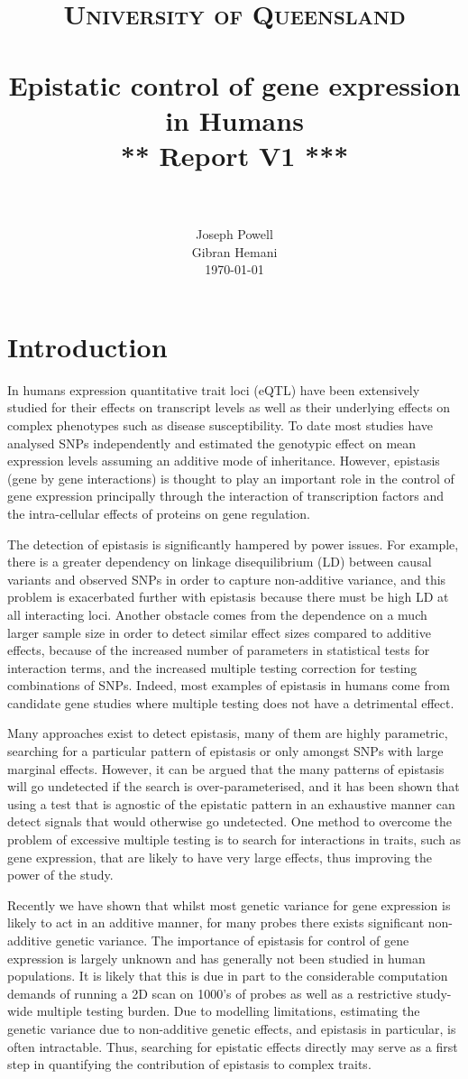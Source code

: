 \documentclass[paper=a4, fontsize=11pt]{scrartcl}	%
\title{
		\usefont{OT1}{bch}{b}{n}
		\normalfont \normalsize \textsc{University of Queensland} \\ [25pt]
		\horrule{0.5pt} \\[0.4cm]
		\huge Epistatic control of gene expression in Humans\\[0.3cm]
        \huge *** Report V1 *** \\
		\horrule{2pt} \\[0.5cm]
}
\author{
		\normalfont 								\normalsize
        Joseph Powell\\[-3pt]		\normalsize
        Gibran Hemani\\[0.2cm]		\normalsize
		\today
}
\date{}
\numberwithin{equation}{section}									%
\numberwithin{figure}{section}										%
\numberwithin{table}{section}										%
\begin{document}
\maketitle
\section{Introduction}
In humans expression quantitative trait loci (eQTL) have been extensively studied for their effects on transcript levels as well as their underlying effects on complex phenotypes such as disease susceptibility. To date most studies have analysed SNPs independently and estimated the genotypic effect on mean expression levels assuming an additive mode of inheritance. However, epistasis (gene by gene interactions) is thought to play an important role in the control of gene expression principally through the interaction of transcription factors and the intra-cellular effects of proteins on gene regulation.

The detection of epistasis is significantly hampered by power issues. For example, there is a greater dependency on linkage disequilibrium (LD) between causal variants and observed SNPs in order to capture non-additive variance, and this problem is exacerbated further with epistasis because there must be high LD at all interacting loci. Another obstacle comes from the dependence on a much larger sample size in order to detect similar effect sizes compared to additive effects, because of the increased number of parameters in statistical tests for interaction terms, and the increased multiple testing correction for testing combinations of SNPs. Indeed, most examples of epistasis in humans come from candidate gene studies where multiple testing does not have a detrimental effect. 

Many approaches exist to detect epistasis, many of them are highly parametric, searching for a particular pattern of epistasis or only amongst SNPs with large marginal effects. However, it can be argued that the many patterns of epistasis will go undetected if the search is over-parameterised, and it has been shown that using a test that is agnostic of the epistatic pattern in an exhaustive manner can detect signals that would otherwise go undetected. One method to overcome the problem of excessive multiple testing is to search for interactions in traits, such as gene expression, that are likely to have very large effects, thus improving the power of the study.

Recently we have shown that whilst most genetic variance for gene expression is likely to act in an additive manner, for many probes there exists significant non-additive genetic variance. The importance of epistasis for control of gene expression is largely unknown and has generally not been studied in human populations. It is likely that this is due in part to the considerable computation demands of running a 2D scan on 1000's of probes as well as a restrictive study-wide multiple testing burden. Due to modelling limitations, estimating the genetic variance due to non-additive genetic effects, and epistasis in particular, is often intractable. Thus, searching for epistatic effects directly may serve as a first step in quantifying the contribution of epistasis to complex traits.
\end{document}
